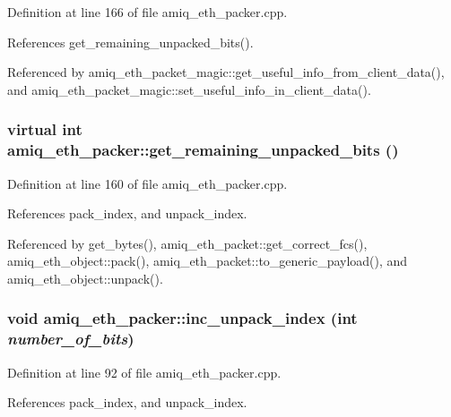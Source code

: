 Definition at line 166 of file amiq\_\-eth\_\-packer.cpp.

References get\_\-remaining\_\-unpacked\_\-bits().

Referenced by amiq\_\-eth\_\-packet\_\-magic::get\_\-useful\_\-info\_\-from\_\-client\_\-data(), and amiq\_\-eth\_\-packet\_\-magic::set\_\-useful\_\-info\_\-in\_\-client\_\-data().\hypertarget{classamiq__eth__packer_a471a75ac1b30c5514c1e3e872cf2cee3}{
\subsubsection[{get\_\-remaining\_\-unpacked\_\-bits}]{\setlength{\rightskip}{0pt plus 5cm}virtual int amiq\_\-eth\_\-packer::get\_\-remaining\_\-unpacked\_\-bits ()}}
\label{classamiq__eth__packer_a471a75ac1b30c5514c1e3e872cf2cee3}


Definition at line 160 of file amiq\_\-eth\_\-packer.cpp.

References pack\_\-index, and unpack\_\-index.

Referenced by get\_\-bytes(), amiq\_\-eth\_\-packet::get\_\-correct\_\-fcs(), amiq\_\-eth\_\-object::pack(), amiq\_\-eth\_\-packet::to\_\-generic\_\-payload(), and amiq\_\-eth\_\-object::unpack().\hypertarget{classamiq__eth__packer_a9bf86e302dc4da5c4ff9947746a37d10}{
\subsubsection[{inc\_\-unpack\_\-index}]{\setlength{\rightskip}{0pt plus 5cm}void amiq\_\-eth\_\-packer::inc\_\-unpack\_\-index (int {\em number\_\-of\_\-bits})}}
\label{classamiq__eth__packer_a9bf86e302dc4da5c4ff9947746a37d10}


Definition at line 92 of file amiq\_\-eth\_\-packer.cpp.

References pack\_\-index, and unpack\_\-index.

